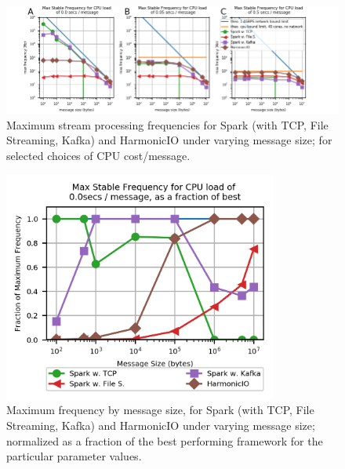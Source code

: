 \documentclass[conference]{IEEEtran}
\begin{document}
\begin{figure}[h]
\hspace*{-4cm}
\begin{center}
\includegraphics[width=\textwidth]{images/selected_simple_plots.png}
\end{center}
\hspace*{-5cm}
\caption{Maximum stream processing frequencies for Spark (with TCP, File Streaming, Kafka) and HarmonicIO under varying message size; for selected choices of CPU cost/message.}
\label{fig:all-results}
\end{figure}

\begin{figure}[h]
\begin{center}
\includegraphics[width=9cm]{images/normalized_0.png}
\end{center}
\caption{Maximum frequency by message size, for Spark (with TCP, File Streaming, Kafka) and HarmonicIO under varying message size; normalized as a fraction of the best performing framework for the particular parameter values.}
\label{fig:result-normed}
\end{figure}
\end{document}
